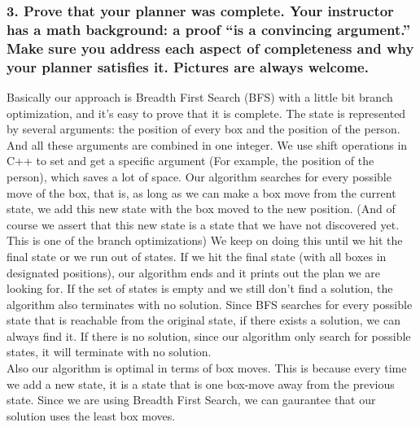 \documentclass[10pt, letter]{article}
\begin{document}
\subsubsection*{3. Prove that your planner was complete. Your instructor has a math background: a proof ``is
a convincing argument.'' Make sure you address each aspect of completeness and why your
planner satisfies it. Pictures are always welcome.}
Basically our approach is Breadth First Search (BFS) with a little bit branch optimization, and it's easy to prove that it is complete.
The state is represented by several arguments: the position of every box and the position of the person.
And all these arguments are combined in one integer.
We use shift operations in C++ to set and get a specific argument (For example, the position of the person), which saves a lot of space.
Our algorithm searches for every possible move of the box, that is, as long as we can make a box move from the current state, we add this new state with the box moved to the new position. 
(And of course we assert that this new state is a state that we have not discovered yet. This is one of the branch optimizations)
We keep on doing this until we hit the final state or we run out of states.
If we hit the final state (with all boxes in designated positions), our algorithm ends and it prints out the plan we are looking for.
If the set of states is empty and we still don't find a solution, the algorithm also terminates with no solution.
Since BFS searches for every possible state that is reachable from the original state, if there exists a solution, we can always find it.
If there is no solution, since our algorithm only search for possible states, it will terminate with no solution.
\\Also our algorithm is optimal in terms of box moves. This is because every time we add a new state, it is a state that is one box-move away from the previous state.
Since we are using Breadth First Search, we can gaurantee that our solution uses the least box moves.
\end{document}
